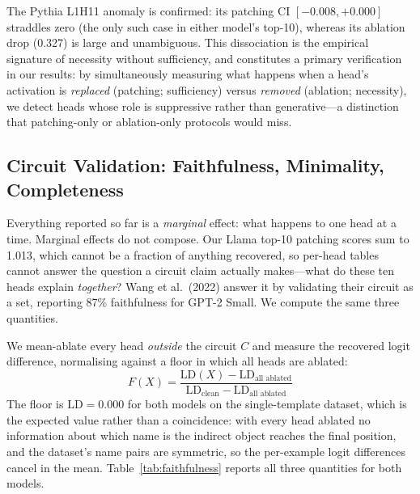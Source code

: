 \documentclass[11pt,a4paper]{article}
\begin{document}
The Pythia L1H11 anomaly is confirmed: its patching
CI $[-0.008, +0.000]$ straddles zero (the only such case in either model's top-10),
whereas its ablation drop (0.327) is large and unambiguous. This dissociation is the
empirical signature of necessity without sufficiency, and constitutes a primary
verification in our results: by simultaneously measuring what happens when a head's
activation is \emph{replaced} (patching; sufficiency) versus \emph{removed} (ablation;
necessity), we detect heads whose role is suppressive rather than generative---a
distinction that patching-only or ablation-only protocols would miss.

\subsection{Circuit Validation: Faithfulness, Minimality, Completeness}
\label{sec:faithfulness}

Everything reported so far is a \emph{marginal} effect: what happens to one head at a
time. Marginal effects do not compose. Our Llama top-10 patching scores sum to 1.013,
which cannot be a fraction of anything recovered, so per-head tables cannot answer the
question a circuit claim actually makes---what do these ten heads explain \emph{together}?
Wang et al.\ (2022) answer it by validating their circuit as a set, reporting 87\%
faithfulness for GPT-2 Small. We compute the same three quantities.

We mean-ablate every head \emph{outside} the circuit $C$ and measure the recovered logit
difference, normalising against a floor in which all heads are ablated:
\begin{equation}
  F(X) = \frac{\mathrm{LD}(X) - \mathrm{LD}_{\text{all ablated}}}
              {\mathrm{LD}_{\text{clean}} - \mathrm{LD}_{\text{all ablated}}}
\end{equation}
The floor is $\mathrm{LD} = 0.000$ for both models on the single-template dataset, which
is the expected value rather than a coincidence: with every head ablated no information
about which name is the indirect object reaches the final position, and the dataset's
name pairs are symmetric, so the per-example logit differences cancel in the mean.
Table~\ref{tab:faithfulness} reports all three quantities for both models.
\end{document}
